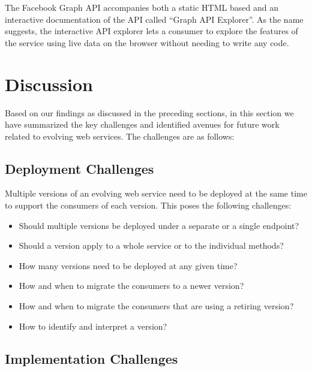\documentclass[runningheads,a4paper]{llncs}
\begin{document}
The Facebook Graph API accompanies both a static HTML based and an interactive documentation of the API called ``Graph API Explorer''. As the name suggests, the interactive API explorer lets a consumer to explore the features of the service using live data on the browser without needing to write any code.



\section{Discussion} %
\label{sec:discussion}

Based on our findings as discussed in the preceding sections, in this section we have summarized the key challenges and identified avenues for future work related to evolving web services. The challenges are as follows:

\subsection{Deployment Challenges} %
\label{sub:deployment_challenges}

Multiple versions of an evolving web service need to be deployed at the same time to support the consumers of each version. This poses the following challenges:
\begin{itemize}
  \item Should multiple versions be deployed under a separate or a single endpoint?
  \item Should a version apply to a whole service or to the individual methods?
  \item How many versions need to be deployed at any given time?
  \item How and when to migrate the consumers to a newer version?
  \item How and when to migrate the consumers that are using a retiring version?
  \item How to identify and interpret a version?
\end{itemize}


\subsection{Implementation Challenges} %
\label{sub:implementation_challenges}
\end{document}
